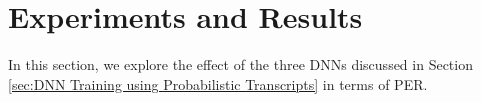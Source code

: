 \documentclass[a4paper]{article}
\begin{document}

\vspace{-2mm}
\section{Experiments and Results} \vspace{-1mm}
\label{sec:Experiments and Results}
In this section, we explore the effect of the three DNNs discussed in Section \ref{sec:DNN Training using Probabilistic Transcripts} in terms of PER. \vspace{-3mm}
\end{document}
